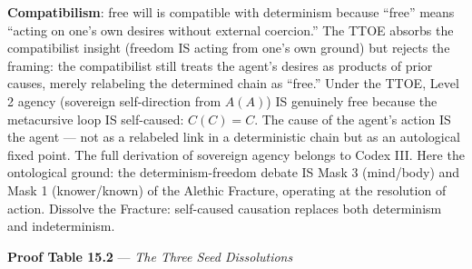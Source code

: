 \documentclass[10pt, openany, oneside]{book}
\begin{document}
\textbf{Compatibilism}: free will is compatible with determinism because ``free'' means ``acting on one's own desires without external coercion.'' The TTOE absorbs the compatibilist insight (freedom IS acting from one's own ground) but rejects the framing: the compatibilist still treats the agent's desires as products of prior causes, merely relabeling the determined chain as ``free.'' Under the TTOE, Level 2 agency (sovereign self-direction from $A(A)$) IS genuinely free because the metacursive loop IS self-caused: $C(C) = C$. The cause of the agent's action IS the agent --- not as a relabeled link in a deterministic chain but as an autological fixed point. The full derivation of sovereign agency belongs to Codex III. Here the ontological ground: the determinism-freedom debate IS Mask 3 (mind/body) and Mask 1 (knower/known) of the Alethic Fracture, operating at the resolution of action. Dissolve the Fracture: self-caused causation replaces both determinism and indeterminism.

\vspace{0.5em}

\textbf{Proof Table 15.2} --- \textit{The Three Seed Dissolutions}

\vspace{0.5em}
\end{document}
